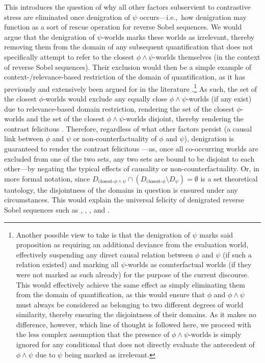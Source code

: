 This introduces the question of why all other factors subservient to contrastive stress are eliminated once denigration of $\psi$ occurs---i.e.,~how denigration may function as a sort of rescue operation for reverse Sobel sequences. We would argue that the denigration of $\psi$-worlds marks these worlds as irrelevant, thereby removing them from the domain of any subsequent quantification that does not specifically attempt to refer to the closest $\phi\land\psi$-worlds themselves (in the context of reverse Sobel sequences). Their exclusion would then be a simple example of context-/relevance-based restriction of the domain of quantification, as it has previously and extensively been argued for in the literature \parencites[see][]{Fintel1994}{Reimer1998}[amongst many others]{Stanley2000}.\footnote{Another possible view to take is that the denigration of $\psi$ marks said proposition as requiring an additional deviance from the evaluation world, effectively suspending any direct causal relation between $\phi$ and $\psi$ (if such a relation existed) and marking all $\psi$-worlds as counterfactual worlds (if they were not marked as such already) for the purpose of the current discourse. This would effectively achieve the same effect as simply eliminating them from the domain of quantification, as this would ensure that $\phi$ and $\phi\land\psi$ must always be considered as belonging to two different degrees of world similarity, thereby ensuring the disjointness of their domains. As it makes no difference, however, which line of thought is followed here, we proceed with the less complex assumption that the presence of $\phi\land\psi$-worlds is simply ignored for any conditional that does not directly evaluate the antecedent of $\phi\land\psi$ due to $\psi$ being marked as irrelevant.} As such, the set of the closest $\phi$-worlds would exclude any equally close $\phi\land\psi$-worlds (if any exist) due to relevance-based domain restriction, rendering the set of the closest $\phi$-worlds and the set of the closest $\phi\land\psi$-worlds disjoint, thereby rendering the contrast felicitous . Therefore, regardless of what other factors persist (a causal link between $\phi$ and $\psi$ or non-counterfactuality of $\phi$ and $\psi$), denigration is guaranteed to render the contrast felicitous ---as, once all co-occurring worlds are excluded from one of the two sets, any two sets are bound to be disjoint to each other---by negating the typical effects of causality or non-counterfactuality. Or, in more formal notation, since $D_{\text{closest-}\phi\land\psi}\cap(D_{\text{closest-}\phi}\setminus D_{\psi})=\emptyset$ is a set theoretical tautology, the disjointness of the domains in question is ensured under any circumstances. This would explain the universal felicity of denigrated reverse Sobel sequences such as , , , and .

